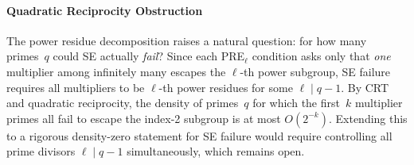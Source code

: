 \paragraph{Quadratic Reciprocity Obstruction}

The power residue decomposition raises a natural question: for how many
primes~$q$ could SE actually \emph{fail}?  Since each PRE$_\ell$
condition asks only that \emph{one} multiplier among infinitely many
escapes the $\ell$-th power subgroup, SE failure requires all
multipliers to be $\ell$-th power residues for some $\ell \mid q{-}1$.
By CRT and quadratic reciprocity, the density of primes~$q$ for which
the first~$k$ multiplier primes all fail to escape the index-2
subgroup is at most $O(2^{-k})$.  Extending this to a rigorous
density-zero statement for SE failure would require controlling all
prime divisors $\ell \mid q{-}1$ simultaneously, which remains open.

